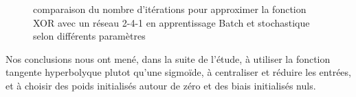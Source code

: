 \documentclass[
    10pt,
    a4paper,
    oneside,
    headinclude,footinclude,
    BCOR=5mm,
    captions=tableabove
]{scrartcl}
\begin{document}
\begin{figure}[H]
\centering
{}
\hspace{1mm}
\vspace{2mm}
\hspace{1mm}

\caption{comparaison du nombre d'itérations pour approximer la fonction XOR avec un réseau 2-4-1 en apprentissage Batch et stochastique selon différents paramètres}
\end{figure}

Nos conclusions nous ont mené, dans la suite de l'étude, à utiliser la fonction tangente hyperbolyque plutot qu'une sigmoïde, à centraliser et réduire les entrées, et à choisir des poids initialisés autour de zéro et des biais initialisés nuls.
\end{document}
